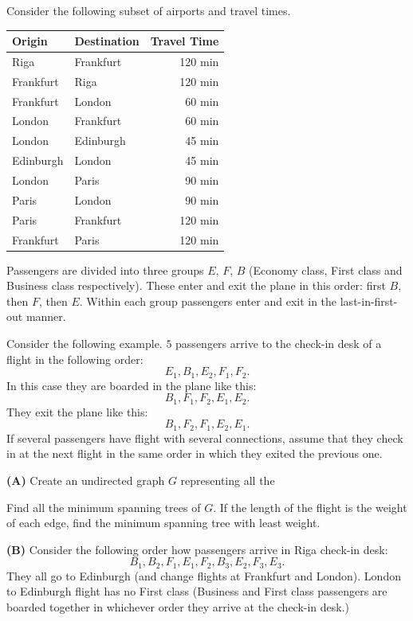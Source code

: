 \documentclass[a4paper,12pt]{article}
\begin{document}
Consider the following subset of airports and travel times. 

\vspace{10pt}
\begin{tabular}{|l|l|r|} \hline
{\bf Origin} & {\bf Destination} & {\bf Travel Time} \\ \hline
Riga & Frankfurt & 120 min \\ \hline
Frankfurt & Riga & 120 min \\ \hline
Frankfurt & London & 60 min \\ \hline
London & Frankfurt & 60 min \\ \hline
London & Edinburgh & 45 min \\ \hline
Edinburgh & London & 45 min \\ \hline
London & Paris & 90 min \\ \hline
Paris & London & 90 min \\ \hline
Paris & Frankfurt & 120 min \\ \hline
Frankfurt & Paris & 120 min \\ \hline
\end{tabular}

\vspace{10pt}
Passengers are divided into three groups $E$, $F$, $B$ (Economy class, First class and Business class respectively).
These enter and exit the plane in this order: first $B$, then $F$, then $E$.
Within each group passengers enter and exit in the last-in-first-out manner.

Consider the following example. 
$5$ passengers arrive to the check-in desk of a flight in the following order:
$$E_1, B_1, E_2, F_1, F_2.$$
In this case they are boarded in the plane like this: 
$$B_1, F_1, F_2, E_1, E_2.$$
They exit the plane like this:
$$B_1, F_2, F_1, E_2, E_1.$$
If several passengers have flight with several connections, assume that they check in at the next flight
in the same order in which they exited the previous one. 




\vspace{5pt}
{\bf (A)} Create an undirected graph $G$ representing all the 

Find all the minimum spanning trees of $G$. 
If the length of the flight is the weight of each edge, 
find the minimum spanning tree with least weight.

\vspace{5pt}
{\bf (B)} Consider the following order how passengers arrive in Riga check-in desk: 
$$B_1, B_2, F_1, E_1, F_2, B_3, E_2, F_3, E_3.$$
They all go to Edinburgh (and change flights at Frankfurt and London). 
London to Edinburgh flight has no First class 
(Business and First class passengers are boarded together in whichever order they arrive
at the check-in desk.)
\end{document}
